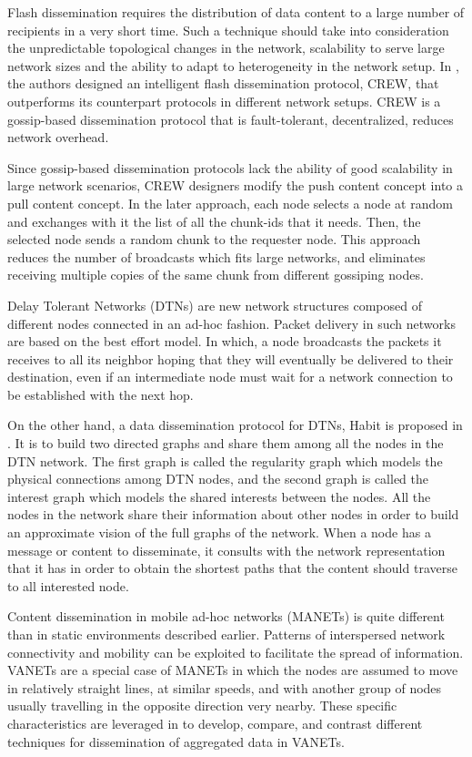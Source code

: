\documentclass{IEEEtran}
\begin{document}
Flash dissemination requires the distribution of data content to a large number of recipients in a very short time. Such a technique should take into consideration the unpredictable topological changes in the network, scalability to serve large network sizes and the ability to adapt to heterogeneity in the network setup.
In \cite{crew}, the authors designed an intelligent flash dissemination protocol, CREW, that outperforms its counterpart protocols in different network setups. CREW is a gossip-based dissemination protocol that is fault-tolerant, decentralized, reduces network overhead.

Since gossip-based dissemination protocols lack the ability of good scalability in large network scenarios, CREW designers modify the push content concept into a pull content concept. In the later approach, each node selects a node at random and exchanges with it the list of all the chunk-ids that it needs.
Then, the selected node sends a random chunk to the requester node. This approach reduces the number of broadcasts which fits large networks, and eliminates receiving multiple copies of the same chunk from different gossiping nodes.

Delay Tolerant Networks (DTNs) are new network structures composed of different nodes connected in an ad-hoc fashion. Packet delivery in such networks are based on the best effort model. In which, a node broadcasts the packets it receives to all its neighbor hoping that they will eventually be delivered to their destination, even if an intermediate node must wait for a network connection to be established with the next hop.

On the other hand, a data dissemination protocol for DTNs, Habit is proposed in \cite{habit}. It is to build two directed graphs and share them among all the nodes in the DTN network. The first graph is called the regularity graph which models the physical connections among DTN nodes, and the second graph is called the interest graph which models the shared interests between the nodes.
All the nodes in the network share their information about other nodes in order to build an approximate vision of the full graphs of the network. When a node has a message or content to disseminate, it consults with the network representation that it has in order to obtain the shortest paths that the content should traverse to all interested node.

Content dissemination in mobile ad-hoc networks (MANETs) is quite different than in static environments described earlier.
Patterns of interspersed network connectivity and mobility can be exploited to facilitate the spread of information.
VANETs are a special case of MANETs in which the nodes are assumed to move in relatively straight lines, at similar speeds, and with another group of nodes usually travelling in the opposite direction very nearby.
These specific characteristics are leveraged in \cite{vanet_dissem} to develop, compare, and contrast different techniques for dissemination of aggregated data in VANETs.
\end{document}
